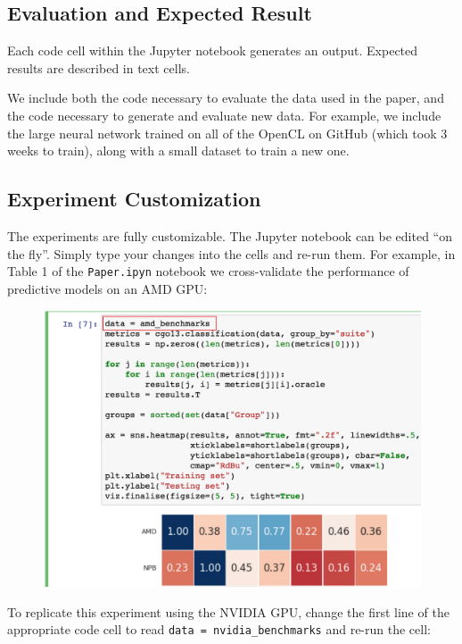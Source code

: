 \subsection{Evaluation and Expected Result}

Each code cell within the Jupyter notebook generates an output. Expected results are described in text cells.

We include both the code necessary to evaluate the data used in the paper, and the code necessary to generate and evaluate new data. For example, we include the large neural network trained on all of the OpenCL on GitHub (which took 3 weeks to train), along with a small dataset to train a new one.

\newpage
\subsection{Experiment Customization}

The experiments are fully customizable. The Jupyter notebook can be edited ``on the fly''. Simply type your changes into the cells and re-run them. For example, in Table 1 of the \texttt{Paper.ipyn} notebook we cross-validate the performance of predictive models on an AMD GPU:

\begin{figure}[H]
  \includegraphics[width=\columnwidth]{img/example-1}
\end{figure}

\noindent
To replicate this experiment using the NVIDIA GPU, change the first line of the appropriate code cell to read \texttt{data = nvidia\_benchmarks} and re-run the cell:


